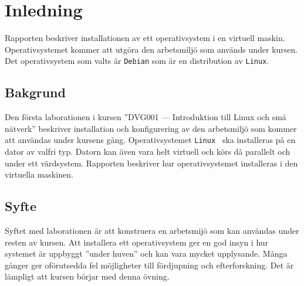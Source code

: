 %


\section{Inledning}\label{inledning}
Rapporten beskriver installationen av ett operativsystem i en
virtuell maskin. Operativsystemet kommer att utgöra den arbetsmiljö som används
under kursen. Det operativsystem som valts är \texttt{Debian} som är en
distribution av \texttt{Linux}.


\subsection{Bakgrund}
Den första laborationen i kursen ''DVG001 --- Introduktion till Linux och små
nätverk'' beskriver installation och konfigurering av den arbetsmiljö som
kommer att användas under kursens gång. Operativsystemet \texttt{Linux } ska
installeras på en dator av valfri typ.  Datorn kan även vara helt virtuell och
körs då parallelt och under ett värdsystem. Rapporten beskriver hur
operativsystemet installeras i den virtuella maskinen.


\subsection{Syfte}
Syftet med laborationen är att konstruera en arbetsmijö som kan användas under
resten av kursen. Att installera ett operativsystem ger en god insyn i hur 
systemet är uppbyggt ''under huven'' och kan vara mycket upplysande.
Många gånger ger oförutsedda fel möjligheter till fördjupning och
efterforskning. Det är lämpligt att kursen börjar med denna övning.


